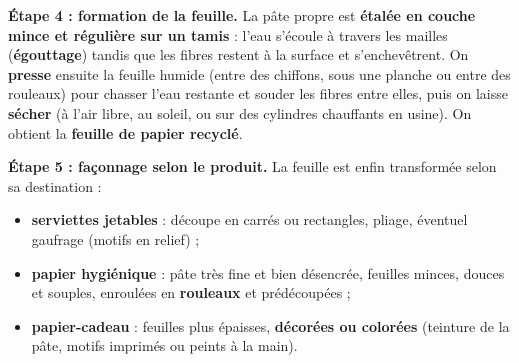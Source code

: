 \documentclass[11pt]{article}
\begin{document}
\textbf{Étape 4 : formation de la feuille.} La pâte propre est \textbf{étalée en couche mince et régulière sur un tamis} : l'eau s'écoule à travers les mailles (\textbf{égouttage}) tandis que les fibres restent à la surface et s'enchevêtrent. On \textbf{presse} ensuite la feuille humide (entre des chiffons, sous une planche ou entre des rouleaux) pour chasser l'eau restante et souder les fibres entre elles, puis on laisse \textbf{sécher} (à l'air libre, au soleil, ou sur des cylindres chauffants en usine). On obtient la \textbf{feuille de papier recyclé}.

\textbf{Étape 5 : façonnage selon le produit.} La feuille est enfin transformée selon sa destination :
\begin{itemize}
\item \textbf{serviettes jetables} : découpe en carrés ou rectangles, pliage, éventuel gaufrage (motifs en relief) ;
\item \textbf{papier hygiénique} : pâte très fine et bien désencrée, feuilles minces, douces et souples, enroulées en \textbf{rouleaux} et prédécoupées ;
\item \textbf{papier-cadeau} : feuilles plus épaisses, \textbf{décorées ou colorées} (teinture de la pâte, motifs imprimés ou peints à la main).
\end{itemize}
\end{document}
